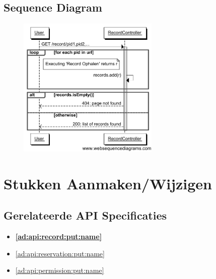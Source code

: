 \documentclass[a4paper,titlepage]{report}
\begin{document}
    \subsection{Sequence Diagram}
    \begin{figure}[H]
      \label{fig:get-record-sequence}
      \centering
      \includegraphics[width=0.6\textwidth,trim=0 0.4cm 0
      0,clip]{get_record_sequence.pdf}
    \end{figure}
    \pagebreak

  \section{Stukken Aanmaken/Wijzigen}
    \label{sec:put-record-sequence}
    \subsection{Gerelateerde API Specificaties}
      \begin{itemize}
        \item \textbf{\ref{ad:api:record:put:name}}
        \item \ref{ad:api:reservation:put:name}
        \item \ref{ad:api:permission:put:name}
      \end{itemize}
\end{document}
